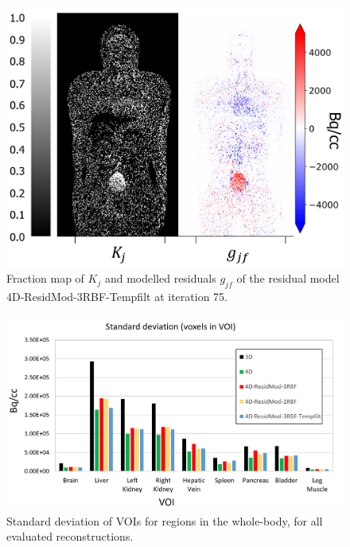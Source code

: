 \begin{figure} [!htbp]
\centering
\includegraphics[scale=0.44 ,angle=0]{3_Results/3_4_Residual/figures/FractionMap.png}
\caption{Fraction map of $K_j$ and modelled residuals $g_{jf}$ of the residual model 4D-ResidMod-3RBF-Tempfilt at iteration 75.} 
\label{fig:FractionMap}
\end{figure}

\begin{figure} [!htbp]
\centering
\includegraphics[scale=0.65 ,angle=0]{3_Results/3_4_Residual/figures/BarPlot.png}
\caption{Standard deviation of VOIs for regions in the whole-body, for all evaluated reconstructions.} 
\label{fig:BarPlot}
\end{figure}

